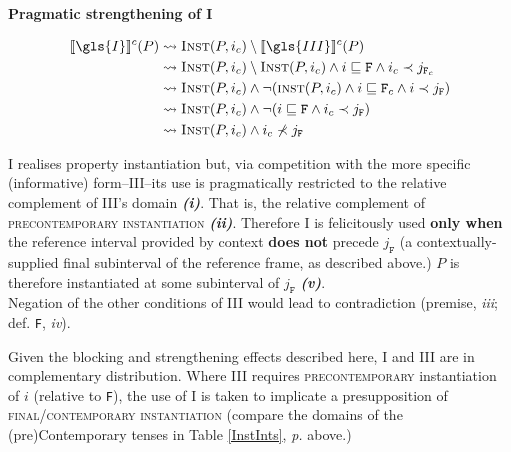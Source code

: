 \pex\textbf{Pragmatic strengthening of \gls{I}}%
\par\nobreak

\begin{align}
	\denote[c]{\gls{I}}(P)&\rightsquigarrow \textsc{Inst}(P,i_c)\setminus\denote[c]{\gls{III}}(P) \\
	&\rightsquigarrow \textsc{Inst}(P,i_c)\setminus \textsc{Inst}(P,i_c)\wedge i\sqsubseteq\mathtt{F}\wedge i_c\prec j_{\mathtt{F}_c}\\
	&\rightsquigarrow \textsc{Inst}(P,i_c)\wedge\neg(\textsc{inst}(P,i_c)\wedge i\sqsubseteq\texttt{F}_c\wedge i\prec j_{\texttt{F}})\\
	&\rightsquigarrow\textsc{Inst}(P,i_c)\wedge\neg(i\sqsubseteq\texttt{F}\wedge i_c\prec j_{\texttt{F}}) \\
	&\rightsquigarrow\textsc{Inst}(P,i_c)\wedge i_c\nprec j_{\texttt{F}}
\end{align}

\small\gls{I} realises property instantiation but, via competition with the more specific (informative) form--\gls{III}--its use is pragmatically restricted to the relative complement of \gls{III}'s domain \textbf{\textit{(i)}}. That is, the relative complement of \textsc{precontemporary instantiation} \textbf{\textit{(ii)}}. Therefore \gls{I} is felicitously used \textbf{only when} the reference interval provided by context \textbf{does not} precede $ j_{\texttt{F}} $ (a contextually-supplied final subinterval of the reference frame, as described above.) $ P $ is therefore instantiated at some subinterval of $ j_{\texttt{F}} $ \textbf{\textit{(v)}}.\\Negation of the other conditions of \gls{III} would lead to contradiction (premise, \textit{iii}; def. \texttt{F}, \textit{iv}).
\xe

Given the blocking and strengthening effects described here, \gls{I} and \gls{III} are in complementary distribution. Where \gls{III} requires \textsc{precontemporary} instantiation of $ i $ (relative to \texttt{F}), the use of \gls{I} is taken to implicate a presupposition of \textsc{final/contemporary instantiation} (compare the domains of the (pre)Contemporary tenses in Table \ref{InstInts}, \textit{p. \pageref{InstInts}} above.) 

